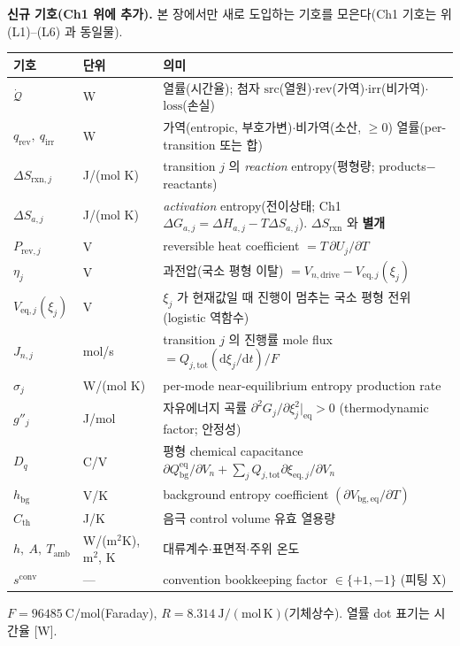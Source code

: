 \documentclass[11pt,a4paper]{article}
\newcommand{\dd}{\mathrm{d}}
\newcommand{\eq}{\mathrm{eq}}
\newcommand{\drive}{\mathrm{drive}}
\newcommand{\bg}{\mathrm{bg}}
\newcommand{\tot}{\mathrm{tot}}
\newcommand{\irr}{\mathrm{irr}}
\newcommand{\rev}{\mathrm{rev}}
\newcommand{\rxn}{\mathrm{rxn}}
\newcommand{\src}{\mathrm{src}}
\newcommand{\loss}{\mathrm{loss}}
\newcommand{\amb}{\mathrm{amb}}
\newcommand{\conv}{\mathrm{conv}}
\begin{document}
\textbf{신규 기호(Ch1 위에 추가).} 본 장에서만 새로 도입하는 기호를 모은다(Ch1 기호는 위 (L1)--(L6) 과 동일물).
\begin{longtable}{p{} p{} p{}}
\toprule 기호 & 단위 & 의미 \\ \midrule \endhead
$\dot{\mathcal Q}$ & W & 열률(시간율); 첨자 $\src$(열원)$\cdot$$\rev$(가역)$\cdot$$\irr$(비가역)$\cdot$$\loss$(손실) \\
$q_\rev,\ q_\irr$ & W & 가역(entropic, 부호가변)$\cdot$비가역(소산, $\ge0$) 열률(per-transition 또는 합) \\
$\Delta S_{\rxn,j}$ & J/(mol K) & transition $j$ 의 \emph{reaction} entropy(평형량; products$-$reactants) \\
$\Delta S_{a,j}$ & J/(mol K) & \emph{activation} entropy(전이상태; Ch1 $\Delta G_{a,j}=\Delta H_{a,j}-T\Delta S_{a,j}$). $\Delta S_{\rxn}$ 와 \textbf{별개} \\
$P_{\rev,j}$ & V & reversible heat coefficient $=T\,\partial U_j/\partial T$ \\
$\eta_j$ & V & 과전압(국소 평형 이탈) $=V_{n,\drive}-V_{\eq,j}(\xi_j)$ \\
$V_{\eq,j}(\xi_j)$ & V & $\xi_j$ 가 현재값일 때 진행이 멈추는 국소 평형 전위(logistic 역함수) \\
$J_{n,j}$ & mol/s & transition $j$ 의 진행률 mole flux $=Q_{j,\tot}(\dd\xi_j/\dd t)/F$ \\
$\sigma_j$ & W/(mol K) & per-mode near-equilibrium entropy production rate \\
$g''_j$ & J/mol & 자유에너지 곡률 $\partial^2 G_j/\partial\xi_j^2|_{\eq}>0$ (thermodynamic factor; 안정성) \\
$D_q$ & C/V & 평형 chemical capacitance $\partial Q_\bg^{\eq}/\partial V_n+\sum_jQ_{j,\tot}\partial\xi_{\eq,j}/\partial V_n$ \\
$h_\bg$ & V/K & background entropy coefficient $(\partial V_{\bg,\eq}/\partial T)$ \\
$C_{\mathrm{th}}$ & J/K & 음극 control volume 유효 열용량 \\
$h,\ A,\ T_\amb$ & W/(m$^2$K), m$^2$, K & 대류계수$\cdot$표면적$\cdot$주위 온도 \\
$s^{\conv}$ & --- & convention bookkeeping factor $\in\{+1,-1\}$ (피팅 X) \\
\bottomrule
\end{longtable}
$F=96485\ \mathrm{C/mol}$(Faraday), $R=8.314\ \mathrm{J/(mol\,K)}$(기체상수). 열률 dot 표기는 시간율 [W].

\end{document}
